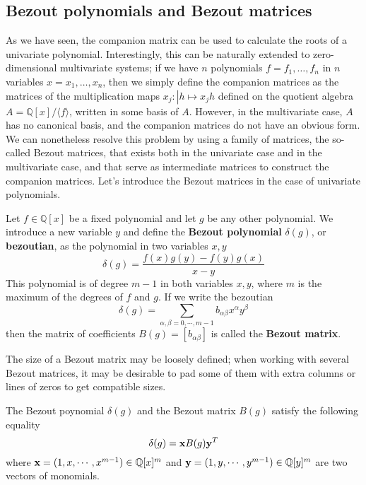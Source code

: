 \documentclass{standalone}
\begin{document}
\subsection{Bezout polynomials and Bezout matrices}
As we have seen, the companion matrix can be used to calculate the roots of a univariate polynomial. 
Interestingly, this can be naturally extended to zero-dimensional multivariate systems; 
if we have $n$ polynomials $f = f_1, \ldots, f_n$ in $n$ variables $x = x_1, \ldots, x_n$, then we simply define the companion matrices as the matrices of the multiplication maps $x_j : \left\vert h \mapsto x_jh \right.$ defined on the quotient algebra $ A = \mathbb{Q}[x]/ \langle f\rangle$, written in some basis of $A$. 
However, in the multivariate case, $A$ has no canonical basis, and the companion matrices do not have an obvious form. 
We can nonetheless resolve this problem by using a family of matrices, the so-called Bezout matrices, that exists both in the univariate case and in the multivariate case, and that serve as intermediate matrices to construct the companion matrices. 
Let's introduce the Bezout matrices in the case of univariate polynomials.

\begin{defn}
\label{def:bez}
Let $f \in \mathbb{Q}[x]$ be a fixed polynomial and let $g$ be any other polynomial. We introduce a new variable $y$ and define the {\bf Bezout polynomial} $\delta(g)$, or {\bf bezoutian}, as the polynomial in two variables $x, y$
$$
\delta(g) = \dfrac{f(x)g(y)-f(y)g(x)}{x-y}
$$
This polynomial is of degree $m-1$ in both variables $x, y$, where $m$ is the maximum of the degrees of $f$ and $g$.
If we write the bezoutian
\begin{equation}
\delta(g) = \sum_{\alpha,\beta = 0, \cdots, m-1} b_{\alpha\beta} x^\alpha y^\beta
\end{equation}
then the matrix of coefficients $B(g) = [b_{\alpha\beta}]$ is called the {\bf Bezout matrix}.
\end{defn}

\begin{rem}
The size of a Bezout matrix may be loosely defined; when working with several Bezout matrices, it may be desirable to pad some of them with extra columns or lines of zeros to get compatible sizes.
\end{rem}
\begin{rem}
The Bezout poynomial $\delta(g)$ and the Bezout matrix $B(g)$ satisfy the following equality
\begin{equation}
	\label{xBg}
	\delta(g) = \bold{x} B(g) \bold{y}^T
\end{equation}
where $\bold{x} = (1, x,\cdots, x^{m-1}) \in \mathbb{Q}[x]^m$ and $\bold{y} = (1, y,\cdots, y^{m-1}) \in \mathbb{Q}[y]^m$ are two vectors of monomials.
\end{rem}
\end{document}
